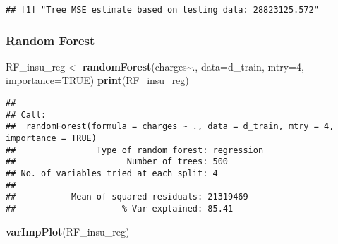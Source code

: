 \documentclass[
]{article}
\newenvironment{Shaded}{\begin{snugshade}}{\end{snugshade}}
\newcommand{\AttributeTok}[1]{\textcolor[rgb]{0.13,0.29,0.53}{#1}}
\newcommand{\ConstantTok}[1]{\textcolor[rgb]{0.56,0.35,0.01}{#1}}
\newcommand{\DecValTok}[1]{\textcolor[rgb]{0.00,0.00,0.81}{#1}}
\newcommand{\FunctionTok}[1]{\textcolor[rgb]{0.13,0.29,0.53}{\textbf{#1}}}
\newcommand{\NormalTok}[1]{#1}
\newcommand{\OtherTok}[1]{\textcolor[rgb]{0.56,0.35,0.01}{#1}}
\newcommand{\SpecialCharTok}[1]{\textcolor[rgb]{0.81,0.36,0.00}{\textbf{#1}}}
\newcommand{\StringTok}[1]{\textcolor[rgb]{0.31,0.60,0.02}{#1}}
\begin{document}
\begin{Shaded}
\end{Shaded}

\begin{verbatim}
## [1] "Tree MSE estimate based on testing data: 28823125.572"
\end{verbatim}

\hypertarget{random-forest}{%
\subsubsection{Random Forest}\label{random-forest}}

\begin{Shaded}
\begin{Highlighting}[]
\NormalTok{RF\_insu\_reg }\OtherTok{\textless{}{-}} \FunctionTok{randomForest}\NormalTok{(charges}\SpecialCharTok{\textasciitilde{}}\NormalTok{., }\AttributeTok{data=}\NormalTok{d\_train, }\AttributeTok{mtry=}\DecValTok{4}\NormalTok{, }\AttributeTok{importance=}\ConstantTok{TRUE}\NormalTok{)}
\FunctionTok{print}\NormalTok{(RF\_insu\_reg)}
\end{Highlighting}
\end{Shaded}

\begin{verbatim}
## 
## Call:
##  randomForest(formula = charges ~ ., data = d_train, mtry = 4,      importance = TRUE) 
##                Type of random forest: regression
##                      Number of trees: 500
## No. of variables tried at each split: 4
## 
##           Mean of squared residuals: 21319469
##                     % Var explained: 85.41
\end{verbatim}

\begin{Shaded}
\begin{Highlighting}[]
\FunctionTok{varImpPlot}\NormalTok{(RF\_insu\_reg)}
\end{Highlighting}
\end{Shaded}
\end{document}
